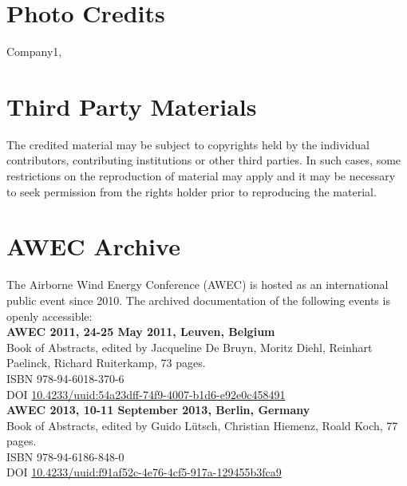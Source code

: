 \begin{multicols*}{2}
\section*{Photo Credits}


Company1, \pageref{photo:company01}


\section*{Third Party Materials}


The credited material may be subject to copyrights held by the individual contributors, contributing institutions or other third parties. In such cases, some restrictions on the reproduction of material may apply and it may be necessary to seek permission from the rights holder prior to reproducing the material.

\newpage

\section*{AWEC Archive}

The Airborne Wind Energy Conference (AWEC) is hosted as an international public event since 2010. The archived documentation of the following events is openly accessible:\\[2mm]

{\bfseries AWEC 2011, 24-25 May 2011, Leuven, Belgium}\\
Book of Abstracts, edited by Jacqueline De Bruyn, Moritz Diehl, Reinhart Paelinck, Richard Ruiterkamp, 73 pages.\\
ISBN 978-94-6018-370-6\\
DOI \href{http://dx.doi.org/10.4233/uuid:54a23dff-74f9-4007-b1d6-e92e0c458491}{10.4233/uuid:54a23dff-74f9-4007-b1d6-e92e0c458491}\\[2mm]

{\bfseries AWEC 2013, 10-11 September 2013, Berlin, Germany}\\
Book of Abstracts, edited by Guido Lütsch, Christian Hiemenz, Roald Koch, 77 pages.\\
ISBN 978-94-6186-848-0\\
DOI \href{http://dx.doi.org/10.4233/uuid:f91af52c-4e76-4cf5-917a-129455b3fca9}{10.4233/uuid:f91af52c-4e76-4cf5-917a-129455b3fca9}\\[2mm]


\end{multicols*}
